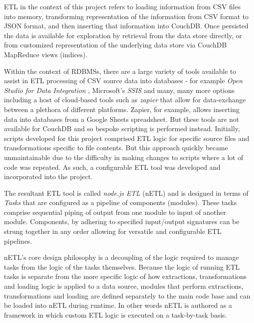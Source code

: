 ETL in the context of this project refers to loading information from CSV files into memory, transforming representation of the information from CSV format to JSON format, and then inserting that information into CouchDB. Once persisted the data is available for exploration by retrieval from the data store directly, or from customized representation of the underlying data store via CouchDB MapReduce views (indices).

Within the context of RDBMSs, there are a large variety of tools available to assist in ETL processing of CSV source data into databases - for example \textit{Open Studio for Data Integration} \cite{talend}, Microsoft's \textit{SSIS} \cite{ssis} and many, many more options including a host of cloud-based tools such as \textit{zapier} \cite{zapier} that allow for data-exchange between a plethora of different platforms. Zapier, for example, allows inserting data into databases from a Google Sheets spreadsheet. But these tools are not available for CouchDB and so bespoke scripting is performed instead. Initially, scripts developed for this project comprised ETL logic for specific source files and transformations specific to file contents. But this approach quickly became unmaintainable due to the difficulty in making changes to scripts where a lot of code was repeated. As such, a configurable ETL tool was developed and incorporated into the project.

The resultant ETL tool is called \textit{node.js ETL} (nETL) and is designed in terms of \textit{Tasks} that are configured as a pipeline of components (modules). These tasks comprise sequential piping of output from one module to input of another module. Components, by adhering to specified input/output signatures can be strung together in any order allowing for versatile and configurable ETL pipelines.

nETL's core design philosophy is a decoupling of the logic required to manage tasks from the logic of the tasks themselves. Because the logic of running ETL tasks is separate from the more specific logic of how extractions, transformations and loading logic is applied to a data source, modules that perform extractions, transformations and loading are defined separately to the main code base and can be loaded into nETL during runtime. In other words nETL is authored as a framework in which custom ETL logic is executed on a task-by-task basis.